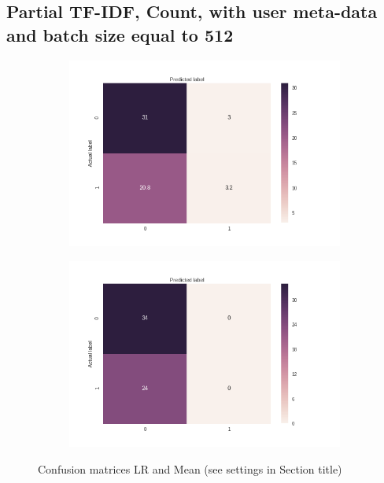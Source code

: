 \documentclass[sigconf]{acmart-txmm}
\begin{document}
\subsection{Partial TF-IDF, Count, with user meta-data and batch size equal to 512}

\begin{figure}[H]
\centering
\begin{subfigure}
  \centering
  \includegraphics[width=1\linewidth]{report/img/conf_matrices/keywords_tfidf_p_count_0_1_512_LR.png}
  \label{fig:keywords_tfidf_p_count_0_1_512_LR}
\end{subfigure}%
\begin{subfigure}
  \centering
  \includegraphics[width=1\linewidth]{report/img/conf_matrices/keywords_tfidf_p_count_0_1_512_mean.png}
  \label{fig:keywords_tfidf_p_count_0_1_512_mean}
\end{subfigure}
\caption{Confusion matrices LR and Mean (see settings in Section title)}
\label{fig:keywords_tfidf_p_count_0_1_512}
\end{figure}


\end{document}
